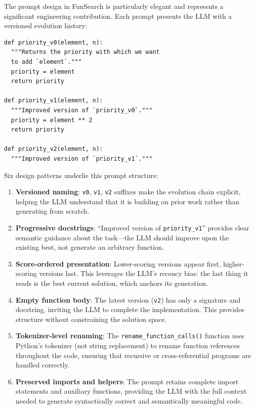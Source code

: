The prompt design in FunSearch is particularly elegant and represents a significant engineering contribution. Each prompt presents the LLM with a versioned evolution history:

\begin{verbatim}
def priority_v0(element, n):
  """Returns the priority with which we want
  to add `element`."""
  priority = element
  return priority

def priority_v1(element, n):
  """Improved version of `priority_v0`."""
  priority = element ** 2
  return priority

def priority_v2(element, n):
  """Improved version of `priority_v1`."""
\end{verbatim}

Six design patterns underlie this prompt structure:
\begin{enumerate}
\item \textbf{Versioned naming}: \texttt{v0}, \texttt{v1}, \texttt{v2} suffixes make the evolution chain explicit, helping the LLM understand that it is building on prior work rather than generating from scratch.
\item \textbf{Progressive docstrings}: ``Improved version of \texttt{priority\_v1}'' provides clear semantic guidance about the task---the LLM should improve upon the existing best, not generate an arbitrary function.
\item \textbf{Score-ordered presentation}: Lower-scoring versions appear first, higher-scoring versions last. This leverages the LLM's recency bias: the last thing it reads is the best current solution, which anchors its generation.
\item \textbf{Empty function body}: The latest version (\texttt{v2}) has only a signature and docstring, inviting the LLM to complete the implementation. This provides structure without constraining the solution space.
\item \textbf{Tokenizer-level renaming}: The \texttt{rename\_function\_calls()} function uses Python's tokenizer (not string replacement) to rename function references throughout the code, ensuring that recursive or cross-referential programs are handled correctly.
\item \textbf{Preserved imports and helpers}: The prompt retains complete import statements and auxiliary functions, providing the LLM with the full context needed to generate syntactically correct and semantically meaningful code.
\end{enumerate}

